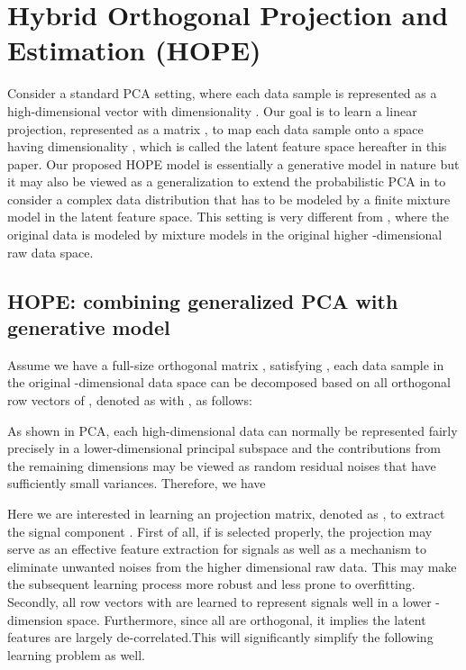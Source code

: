 \documentclass[11pt]{article}
\begin{document}
\section{Hybrid Orthogonal Projection and Estimation (HOPE)}
\label{sec_hope}

Consider a standard PCA setting, where each data sample is represented as a high-dimensional vector  with dimensionality . Our goal is to learn a linear projection, represented as a matrix , to map each data sample onto a space having dimensionality , which is called the latent feature space hereafter in this paper.
Our proposed HOPE model is essentially a generative model in nature but it may also be viewed as a generalization to extend the probabilistic PCA in \cite{Tipping99b} to consider a complex data distribution that has to be modeled by a finite mixture model in the latent feature space. This setting is very different from \cite{Tipping_1999}, where 
the original data  is modeled by mixture models in the original higher -dimensional raw data space. 


\subsection{HOPE: combining generalized PCA with generative model}

Assume we have a full-size   orthogonal matrix , satisfying  , each data sample  in the original -dimensional data space  can be decomposed based on all orthogonal row vectors of , denoted as  with , as follows:



As shown in PCA, each high-dimensional data  can normally be represented fairly precisely in a lower-dimensional principal subspace and the contributions from the remaining dimensions may be viewed as random residual noises that have sufficiently small variances. 
Therefore, we have


Here we are interested in learning an  projection matrix, denoted as , to extract the signal component . First of all, if   is selected properly, the projection may serve as an effective feature extraction for signals as well as a mechanism to  eliminate unwanted noises from the higher dimensional raw data. This may make the subsequent learning process more robust and less prone to overfitting. Secondly, all  row vectors  with  are learned to represent signals well in a lower -dimension space. Furthermore, since all  are orthogonal, it implies the latent features are largely de-correlated.This will significantly simplify the following learning problem as well. 
\end{document}

